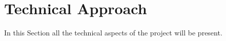 \section{Technical Approach}	%
\label{sec:technical_approach}

In this Section all the technical aspects of the project will be present.





